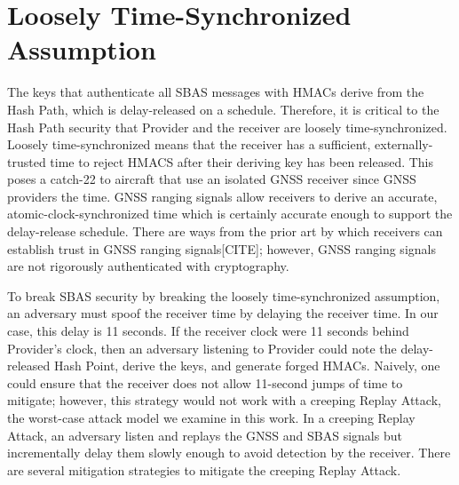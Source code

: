 \documentclass[letterpaper,times]{IONconf/IONconf}
\begin{document}
\section{Loosely Time-Synchronized Assumption}

The keys that authenticate all SBAS messages with HMACs derive from the Hash Path, which is delay-released on a schedule.
Therefore, it is critical to the Hash Path security that Provider and the receiver are loosely time-synchronized.
Loosely time-synchronized means that the receiver has a sufficient, externally-trusted time to reject HMACS after their deriving key has been released.
This poses a catch-22 to aircraft that use an isolated GNSS receiver since GNSS providers the time.
GNSS ranging signals allow receivers to derive an accurate, atomic-clock-synchronized time which is certainly accurate enough to support the delay-release schedule.
There are ways from the prior art by which receivers can establish trust in GNSS ranging signals[CITE]; however, GNSS ranging signals are not rigorously authenticated with cryptography.

To break SBAS security by breaking the loosely time-synchronized assumption, an adversary must spoof the receiver time by delaying the receiver time.
In our case, this delay is 11 seconds.
If the receiver clock were 11 seconds behind Provider's clock, then an adversary listening to Provider could note the delay-released Hash Point, derive the keys, and generate forged HMACs.
Naively, one could ensure that the receiver does not allow 11-second jumps of time to mitigate; however, this strategy would not work with a creeping Replay Attack, the worst-case attack model we examine in this work.
In a creeping Replay Attack, an adversary listen and replays the GNSS and SBAS signals but incrementally delay them slowly enough to avoid detection by the receiver.
There are several mitigation strategies to mitigate the creeping Replay Attack.
\end{document}
